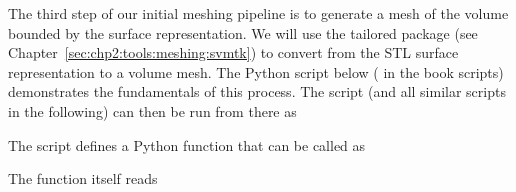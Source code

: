 %
%
The third step of our initial meshing pipeline is to generate a mesh
of the volume bounded by the surface representation. We will use the
tailored package \svmtk{} (see
Chapter~\ref{sec:chp2:tools:meshing:svmtk}) to convert from the STL
surface representation to a volume mesh. The Python script below (
 in the book scripts)
demonstrates the fundamentals of this process. The script (and all
similar scripts in the following) can then be run from there as

The script defines a Python function
 that can be called as

\noindent The function itself reads

